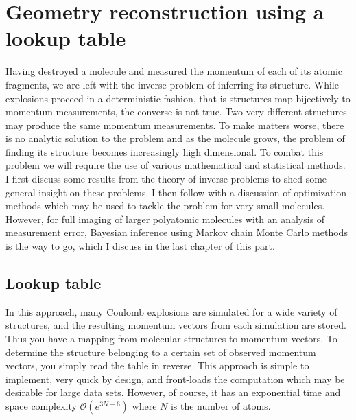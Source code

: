 \chapter{Geometry reconstruction using a lookup table}\label{ch:lookupTable}

Having destroyed a molecule and measured the momentum of each of its atomic fragments, we are left with the inverse problem of inferring its structure. While explosions proceed in a deterministic fashion, that is structures map bijectively to momentum measurements, the converse is not true. Two very different structures may produce the same momentum measurements. To make matters worse, there is no analytic solution to the problem and as the molecule grows, the problem of finding its structure becomes increasingly high dimensional. To combat this problem we will require the use of various mathematical and statistical methods. I first discuss some results from the theory of inverse problems to shed some general insight on these problems. I then follow with a discussion of optimization methods which may be used to tackle the problem for very small molecules. However, for full imaging of larger polyatomic molecules with an analysis of measurement error, Bayesian inference using Markov chain Monte Carlo methods is the way to go, which I discuss in the last chapter of this part.

\section{Lookup table}
In this approach, many Coulomb explosions are simulated for a wide variety of structures, and the resulting momentum vectors from each simulation are stored. Thus you have a mapping from molecular structures to momentum vectors. To determine the structure belonging to a certain set of observed momentum vectors, you simply read the table in reverse. This approach is simple to implement, very quick by design, and front-loads the computation which may be desirable for large data sets. However, of course, it has an exponential time and space complexity $\mathcal{O}(e^{3N-6})$ where $N$ is the number of atoms.